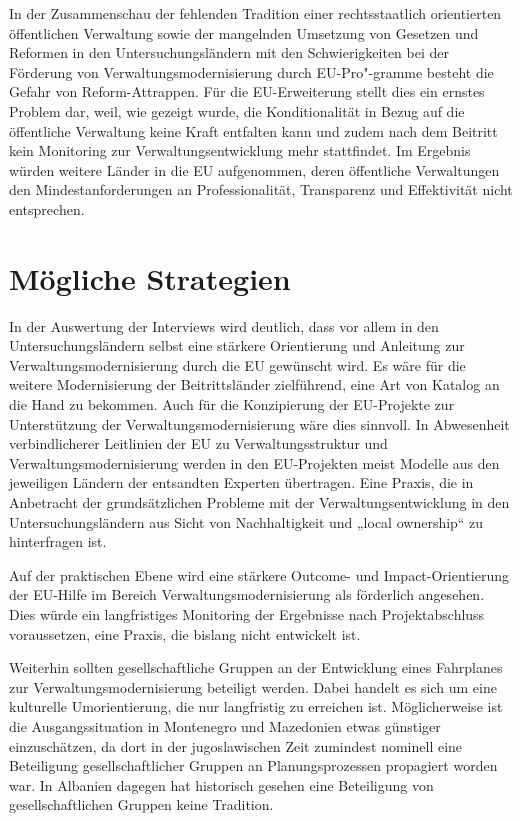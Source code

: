 In der Zusammenschau der fehlenden Tradition einer rechtsstaatlich orientierten öffentlichen Verwaltung sowie der mangelnden Umsetzung von Gesetzen und Reformen in den Untersuchungsländern mit den Schwierigkeiten bei der Förderung von Verwaltungsmodernisierung durch EU-Pro"-gramme besteht die Gefahr von Reform-Attrappen. Für die EU-Erweiterung stellt dies ein ernstes Problem dar, weil, wie gezeigt wurde, die Konditionalität in Bezug auf die öffentliche Verwaltung keine Kraft entfalten kann und zudem nach dem Beitritt kein Monitoring zur Verwaltungsentwicklung mehr stattfindet. Im Ergebnis würden weitere Länder in die EU aufgenommen, deren öffentliche Verwaltungen den Mindestanforderungen an Professionalität, Transparenz und Effektivität nicht entsprechen. 

\section{Mögliche Strategien }
In der Auswertung der Interviews wird deutlich, dass vor allem in den Untersuchungsländern selbst eine stärkere Orientierung und Anleitung zur Verwaltungsmodernisierung durch die EU gewünscht wird. Es wäre für die weitere Modernisierung der Beitrittsländer zielführend, eine Art von Katalog an die Hand zu bekommen. Auch für die Konzipierung der EU-Projekte zur Unterstützung der Verwaltungsmodernisierung wäre dies sinnvoll. In Abwesenheit verbindlicherer Leitlinien der EU zu Verwaltungsstruktur und Verwaltungsmodernisierung werden in den EU-Projekten meist Modelle aus den jeweiligen Ländern der entsandten Experten übertragen. Eine Praxis, die in Anbetracht der grundsätzlichen Probleme mit der Verwaltungsentwicklung in den Untersuchungsländern aus Sicht von Nachhaltigkeit und „local ownership“ zu hinterfragen ist.\par
Auf der praktischen Ebene wird eine stärkere Outcome- und Impact-Orientierung der EU-Hilfe im Bereich Verwaltungsmodernisierung als förderlich angesehen. Dies würde ein langfristiges Monitoring der Ergebnisse nach Projektabschluss voraussetzen, eine Praxis, die bislang nicht entwickelt ist.\par
Weiterhin sollten gesellschaftliche Gruppen an der Entwicklung eines Fahrplanes zur Verwaltungsmodernisierung beteiligt werden. Dabei handelt es sich um eine kulturelle Umorientierung, die nur langfristig zu erreichen ist. Möglicherweise ist die Ausgangssituation in Montenegro und Mazedonien etwas günstiger einzuschätzen, da dort in der jugoslawischen Zeit zumindest nominell eine Beteiligung gesellschaftlicher Gruppen an Planungsprozessen propagiert worden war. In Albanien dagegen hat historisch gesehen eine Beteiligung von gesellschaftlichen Gruppen keine Tradition. \par
